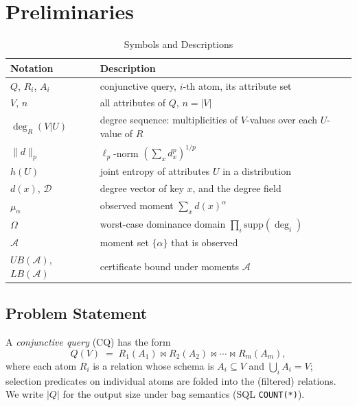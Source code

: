 \section{Preliminaries}
\label{sec:Preliminary}

\begin{table}[t]
\centering \small
\caption{Symbols and Descriptions}
\label{tab:symbol}
\begin{tabular}{|p{2.1cm}|p{5.7cm}|}
\hline
\cellcolor{lightgray}\textbf{Notation} & \cellcolor{lightgray}\textbf{Description} \\ \hline
$Q$, $R_i$, $A_i$ & conjunctive query, $i$-th atom, its attribute set \\ \hline
$V$, $n$ & all attributes of $Q$, $n = |V|$ \\ \hline
$\deg_R(V|U)$ & degree sequence: multiplicities of $V$-values over each $U$-value of $R$ \\ \hline
$\|d\|_p$ & $\ell_p$-norm $(\sum_x d_x^p)^{1/p}$ \\ \hline
$h(U)$ & joint entropy of attributes $U$ in a distribution \\ \hline
$d(x)$, $\mathcal{D}$ & degree vector of key $x$, and the degree field \\ \hline
$\mu_\alpha$ & observed moment $\sum_x d(x)^\alpha$ \\ \hline
$\Omega$ & worst-case dominance domain $\prod_i \mathrm{supp}(\deg_i)$ \\ \hline
$\mathcal{A}$ & moment set $\{\alpha\}$ that is observed \\ \hline
$UB(\mathcal{A})$, $LB(\mathcal{A})$ & certificate bound under moments $\mathcal{A}$ \\ \hline
\end{tabular}
\end{table}

\subsection{Problem Statement}

A \emph{conjunctive query} (CQ) has the form
\begin{equation}
Q(V) \;=\; R_1(A_1) \Join R_2(A_2) \Join \cdots \Join R_m(A_m),
\label{eq:cq}
\end{equation}
where each atom $R_i$ is a relation whose schema is $A_i \subseteq V$
and $\bigcup_i A_i = V$; selection predicates on individual atoms are
folded into the (filtered) relations.  We write $|Q|$ for the output
size under bag semantics (SQL \texttt{COUNT(*)}).

